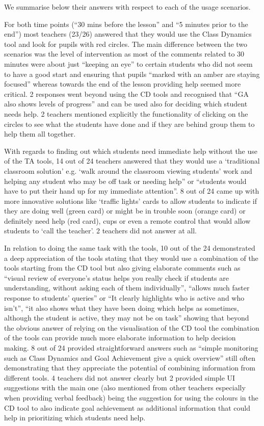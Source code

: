 We summarise below their answers with respect to each of the usage scenarios.

 
For both time points (“30 mins before the lesson” and “5 minutes prior
to the end”) most teachers (23/26) answered that they would use the
Class Dynamics tool and look for pupils with red circles. The main
difference between the two scenarios was the level of intervention as
most of the comments related to 30 minutes were about just “keeping an
eye” to certain students who did not seem to have a good start and
ensuring that pupils “marked with an amber are staying focused”
whereas towards the end of the lesson providing help seemed more
critical. 2 responses went beyond using the CD tools and recognised
that “GA also shows levels of progress” and can be used also for
deciding which student needs help. 2 teachers mentioned explicitly the
functionality of clicking on the circles to see what the students have
done and if they are behind group them to help them all together. 
 
With regards to finding out which students need immediate help without
the use of the TA tools, 14 out of 24 teachers answered that they
would use a ‘traditional classroom solution’ e.g. ‘walk around the
classroom viewing students’ work and helping any student who may be
off task or needing help” or “students would have to put their hand up
for my immediate attention”. 8 out of 24 came up with more innovative
solutions like ‘traffic lights’ cards to allow students to indicate if
they are doing well (green card) or might be in trouble soon (orange
card) or definitely need help (red card), cups or even a remote
control that would allow students to ‘call the teacher’. 2 teachers
did not answer at all.

In relation to doing the same task with the tools, 10 out of the 24
demonstrated a deep appreciation of the tools stating that they would
use a combination of the tools starting from the CD tool but also
giving elaborate comments such as “visual review of everyone’s status
helps you really check if students are understanding, without asking
each of them individually”, “allows much faster response to students’
queries” or “It clearly highlights who is active and who isn’t”, “it
also shows what they have been doing which helps as sometimes,
although the student is active, they may not be on task” showing that
beyond the obvious answer of relying on the visualisation of the CD
tool the combination of the tools can provide much more elaborate
information to help decision making. 8 out of 24 provided
straightforward answers such as “simple monitoring such as Class
Dynamics and Goal Achievement give a quick overview” still often
demonstrating that they appreciate the potential of combining
information from different tools. 4 teachers did not answer clearly
but 2 provided simple UI suggestions with the main one (also mentioned
from other teachers especially when providing verbal feedback) being
the suggestion for using the colours in the CD tool to also indicate
goal achievement as additional information that could help in
prioritizing which students need help. 
 
